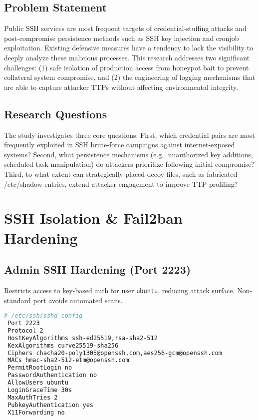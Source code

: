 \documentclass{cls/ULBreport}
\begin{document}
        \subsection{Problem Statement} 
        Public SSH services are most frequent targets of credential-stuffing attacks and post-compromise persistence methods such as SSH key injection and cronjob exploitation. Existing defensive measures have a tendency to lack the visibility to deeply analyze these malicious processes. This research addresses two significant challenges: (1) safe isolation of production access from honeypot bait to prevent collateral system compromise, and (2) the engineering of logging mechanisms that are able to capture attacker TTPs without affecting environmental integrity.

        \subsection{Research Questions}
        The study investigates three core questions: First, which credential pairs are most frequently exploited in SSH brute-force campaigns against internet-exposed systems? Second, what persistence mechanisms (e.g., unauthorized key additions, scheduled task manipulation) do attackers prioritize following initial compromise? Third, to what extent can strategically placed decoy files, such as fabricated /etc/shadow entries, extend attacker engagement to improve TTP profiling?

        
    \section{SSH Isolation \& Fail2ban Hardening}

        
        \subsection{Admin SSH Hardening (Port 2223)}
        Restricts access to key-based auth for user \texttt{ubuntu}, reducing attack surface. Non-standard port avoids automated scans.
        
        \begin{lstlisting}[language=bash,caption={Securing Legitimate Access}]
 # /etc/ssh/sshd_config
 Port 2223
 Protocol 2
 HostKeyAlgorithms ssh-ed25519,rsa-sha2-512
 KexAlgorithms curve25519-sha256
 Ciphers chacha20-poly1305@openssh.com,aes256-gcm@openssh.com
 MACs hmac-sha2-512-etm@openssh.com
 PermitRootLogin no
 PasswordAuthentication no
 AllowUsers ubuntu
 LoginGraceTime 30s
 MaxAuthTries 2
 PubkeyAuthentication yes
 X11Forwarding no
        \end{lstlisting}
        
\end{document}
